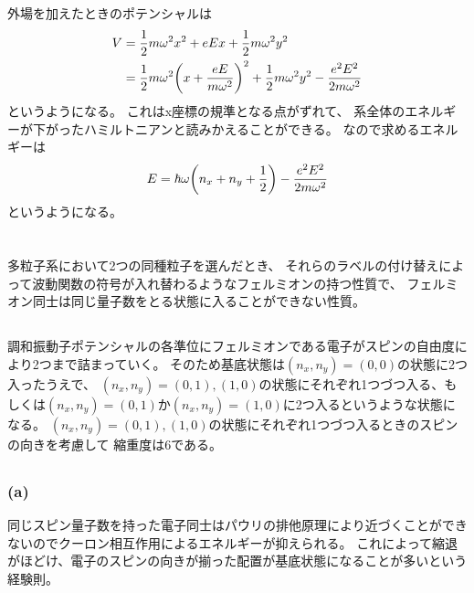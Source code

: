 \documentclass[../../master.tex]{subfiles}
\begin{document}
\section{}
外場を加えたときのポテンシャルは
\begin{align}
    V &= \frac{1}{2}m\omega^2 x^2 + eEx + \frac{1}{2}m\omega^2 y^2\\
    &= \frac{1}{2}m\omega^2 \qty(x+\frac{eE}{m\omega^2})^2 + \frac{1}{2}m\omega^2 y^2 - \frac{e^2E^2}{2m\omega^2}
\end{align}
というようになる。
これはx座標の規準となる点がずれて、
系全体のエネルギーが下がったハミルトニアンと読みかえることができる。
なので求めるエネルギーは
\begin{align}
    E = \hbar\omega\qty(n_x+n_y+\frac{1}{2})- \frac{e^2E^2}{2m\omega^2}
\end{align}
というようになる。

\section{}
\subsection{}
多粒子系において2つの同種粒子を選んだとき、
それらのラベルの付け替えによって波動関数の符号が入れ替わるようなフェルミオンの持つ性質で、
フェルミオン同士は同じ量子数をとる状態に入ることができない性質。

\subsection{}
調和振動子ポテンシャルの各準位にフェルミオンである電子がスピンの自由度により2つまで詰まっていく。
そのため基底状態は\((n_x,n_y)=(0,0)\)の状態に2つ入ったうえで、
\((n_x,n_y)=(0,1),(1,0)\)の状態にそれぞれ1つづつ入る、もしくは\((n_x,n_y)=(0,1)\)か\((n_x,n_y)=(1,0)\)に2つ入るというような状態になる。
\((n_x,n_y)=(0,1),(1,0)\)の状態にそれぞれ1つづつ入るときのスピンの向きを考慮して
縮重度は6である。
\subsection{}
\subsubsection{(a)}
同じスピン量子数を持った電子同士はパウリの排他原理により近づくことができないのでクーロン相互作用によるエネルギーが抑えられる。
これによって縮退がほどけ、電子のスピンの向きが揃った配置が基底状態になることが多いという経験則。
\end{document}
